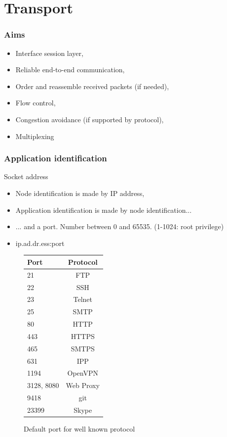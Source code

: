 \section{Transport}
  \begin{frame}
    \frametitle{Aims}
      \begin{itemize}
        \item Interface session layer,
        \item Reliable end-to-end communication,
        \item Order and reassemble received packets (if needed),
        \item Flow control,
        \item Congestion avoidance (if supported by protocol),
        \item Multiplexing
      \end{itemize}
  \end{frame}

  \begin{frame}
    \frametitle{Application identification}
    \begin{block}{Socket address}
      \begin{itemize}
        \item Node identification is made by IP address,
        \item Application identification is made by node identification...
        \item ... and a port. Number between 0 and 65535. (1-1024: root privilege)
        \item \begin{center} ip.ad.dr.ess:port \end{center}
      \end{itemize}
    \end{block}
  \end{frame}

  \begin{frame}
    \begin{figure}
      \centering
      \begin{tabular}{l|c}
        Port  & Protocol \\ \hline
        21    & FTP \\ \hline
        22    & SSH \\ \hline
        23    & Telnet \\ \hline
        25    & SMTP \\ \hline
        80    & HTTP \\ \hline
        443   & HTTPS \\ \hline
        465   & SMTPS \\ \hline
        631   & IPP \\ \hline
        1194  & OpenVPN \\ \hline
        3128, 8080 & Web Proxy \\ \hline
        9418  & git \\ \hline
        23399 & Skype \\ \hline
      \end{tabular}
      \caption{Default port for well known protocol}
      \label{fig:def-port}
    \end{figure}
  \end{frame}

